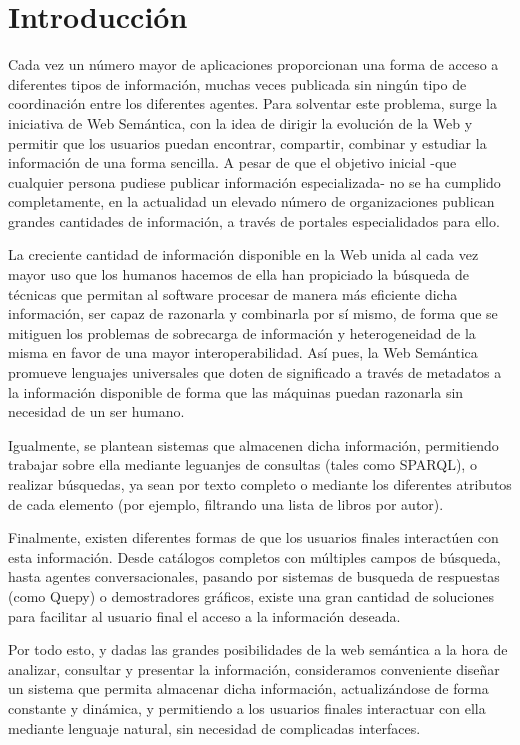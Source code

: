 \documentclass[a4paper,11pt]{report}
\begin{document}
\chapter*{Introducción}\vspace{-1ex}

Cada vez un número mayor de aplicaciones proporcionan una forma de acceso a diferentes tipos de información, muchas veces publicada sin ningún tipo de coordinación entre los diferentes agentes. Para solventar este problema, surge la iniciativa de Web Semántica\cite{webs}, con la idea de dirigir la evolución de la Web y permitir que los usuarios puedan encontrar, compartir, combinar y estudiar la información de una forma sencilla. A pesar de que el objetivo inicial -que cualquier persona pudiese publicar información especializada- no se ha cumplido completamente, en la actualidad un elevado número de organizaciones publican grandes cantidades de información, a través de portales especialidados para ello.

La creciente cantidad de información disponible en la Web unida al cada vez mayor uso que los humanos hacemos de ella han propiciado la búsqueda de técnicas que permitan al software procesar de manera más eficiente dicha información, ser capaz de razonarla y combinarla por sí mismo, de forma que se mitiguen los problemas de sobrecarga de información y heterogeneidad de la misma en favor de una mayor interoperabilidad. Así pues, la Web Semántica promueve lenguajes universales\cite{rdf} que doten de significado a través de metadatos a la información disponible de forma que las máquinas puedan razonarla sin necesidad de un ser humano.

Igualmente, se plantean sistemas que almacenen dicha información, permitiendo trabajar sobre ella mediante leguanjes de consultas (tales como SPARQL), o realizar búsquedas, ya sean por texto completo o mediante los diferentes atributos de cada elemento (por ejemplo, filtrando una lista de libros por autor).

Finalmente, existen diferentes formas de que los usuarios finales interactúen con esta información. Desde catálogos completos con múltiples campos de búsqueda, hasta agentes conversacionales, pasando por sistemas de busqueda de respuestas (como Quepy\cite{quepy}) o demostradores gráficos, existe una gran cantidad de soluciones para facilitar al usuario final el acceso a la información deseada.

Por todo esto, y dadas las grandes posibilidades de la web semántica a la hora de analizar, consultar y presentar la información, consideramos conveniente diseñar un sistema que permita almacenar dicha información, actualizándose de forma constante y dinámica, y permitiendo a los usuarios finales interactuar con ella mediante lenguaje natural, sin necesidad de complicadas interfaces.
\end{document}
